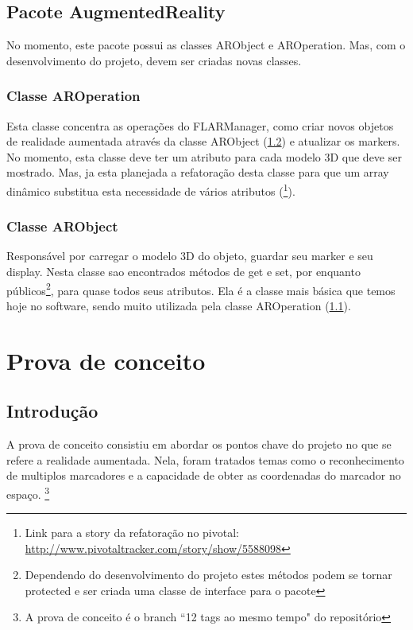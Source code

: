 \documentclass[a4paper,12pt]{book}
\begin{document}
	\section{Pacote AugmentedReality}
		\label{sec:pcpacoteaugmentedreality}
		
		No momento, este pacote possui as classes ARObject e AROperation. Mas, com o
		desenvolvimento do projeto, devem ser criadas novas classes.
		
		\subsection{Classe AROperation}
		\label{subsec:ecclassearoperation}
		Esta classe concentra as opera\c c\~oes do FLARManager, como criar novos
		objetos de realidade aumentada atrav\'es da classe ARObject
		(\ref{subsec:ecclassearobject}) e atualizar os markers.
		No momento, esta classe deve ter um atributo para cada modelo 3D que deve ser
		mostrado. Mas, ja esta planejada a refatora\c c\~ao desta classe para que um
		array din\^amico substitua esta necessidade de v\'arios atributos
		(\footnote{Link para a story da refatora\c c\~ao no	pivotal: \url{http://www.pivotaltracker.com/story/show/5588098}}).
		
		
		\subsection{Classe ARObject}
		\label{subsec:ecclassearobject}
		Respons\'avel por carregar o modelo 3D do objeto, guardar seu marker e seu
		display. Nesta classe sao encontrados m\'etodos de get e set, por enquanto
		p\'ublicos\footnote{Dependendo do desenvolvimento do projeto estes m\'etodos
		podem se tornar protected e ser criada uma classe de interface para o pacote},
		para quase todos seus atributos. Ela \'e a classe mais b\'asica que temos hoje
		no software, sendo muito utilizada pela classe AROperation (\ref{subsec:ecclassearoperation}).
		
	\chapter{Prova de conceito}
	\label{ch:provadeconceito}
		\section{Introdu\c c\~ao}
		\label{sec:pcintroducao}
		A prova de conceito consistiu em abordar os pontos chave do projeto no que se
		refere a realidade aumentada. Nela, foram tratados temas como o reconhecimento
		de multiplos marcadores e a capacidade de obter as coordenadas do marcador no
		espa\c co. \footnote{A prova de conceito \'e o branch ``12 tags ao mesmo
		tempo" do reposit\'orio}
		
\end{document}
